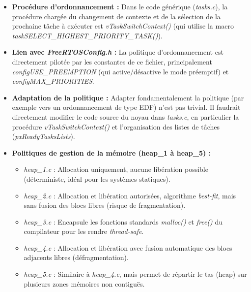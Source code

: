 \begin{itemize}
    \item \textbf{Procédure d'ordonnancement :} Dans le code générique (\textit{tasks.c}), la procédure chargée du changement de contexte et de la sélection de la prochaine tâche à exécuter est \textit{vTaskSwitchContext()} (qui utilise la macro \textit{taskSELECT\_HIGHEST\_PRIORITY\_TASK()}). \\
    
    \item \textbf{Lien avec \textit{FreeRTOSConfig.h} :} La politique d'ordonnancement est directement pilotée par les constantes de ce fichier, principalement \textit{configUSE\_PREEMPTION} (qui active/désactive le mode préemptif) et \textit{configMAX\_PRIORITIES}. \\
    
    \item \textbf{Adaptation de la politique :} Adapter fondamentalement la politique (par exemple vers un ordonnancement de type EDF) n'est pas trivial. Il faudrait directement modifier le code source du noyau dans \textit{tasks.c}, en particulier la procédure \textit{vTaskSwitchContext()} et l'organisation des listes de tâches (\textit{pxReadyTasksLists}). \\
    
    \item \textbf{Politiques de gestion de la mémoire (heap\_1 à heap\_5) :}
    \begin{itemize}
        \item \textit{heap\_1.c} : Allocation uniquement, aucune libération possible (déterministe, idéal pour les systèmes statiques).
        \item \textit{heap\_2.c} : Allocation et libération autorisées, algorithme \textit{best-fit}, mais sans fusion des blocs libres (risque de fragmentation).
        \item \textit{heap\_3.c} : Encapsule les fonctions standards \textit{malloc()} et \textit{free()} du compilateur pour les rendre \textit{thread-safe}.
        \item \textit{heap\_4.c} : Allocation et libération avec fusion automatique des blocs adjacents libres (défragmentation).
        \item \textit{heap\_5.c} : Similaire à \textit{heap\_4.c}, mais permet de répartir le tas (heap) sur plusieurs zones mémoires non contiguës.
    \end{itemize}
\end{itemize}
